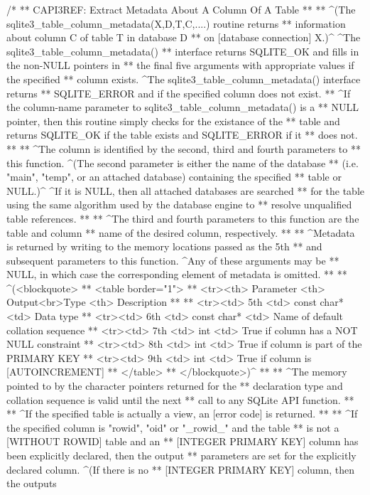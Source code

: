 \begin{Codex}[label=sqlite3.h,numbers=left]
{/*
** CAPI3REF: Extract Metadata About A Column Of A Table
**
** ^(The sqlite3_table_column_metadata(X,D,T,C,....) routine returns
** information about column C of table T in database D
** on [database connection] X.)^  ^The sqlite3_table_column_metadata()
** interface returns SQLITE_OK and fills in the non-NULL pointers in
** the final five arguments with appropriate values if the specified
** column exists.  ^The sqlite3_table_column_metadata() interface returns
** SQLITE_ERROR and if the specified column does not exist.
** ^If the column-name parameter to sqlite3_table_column_metadata() is a
** NULL pointer, then this routine simply checks for the existance of the
** table and returns SQLITE_OK if the table exists and SQLITE_ERROR if it
** does not.
**
** ^The column is identified by the second, third and fourth parameters to
** this function. ^(The second parameter is either the name of the database
** (i.e. "main", "temp", or an attached database) containing the specified
** table or NULL.)^ ^If it is NULL, then all attached databases are searched
** for the table using the same algorithm used by the database engine to
** resolve unqualified table references.
**
** ^The third and fourth parameters to this function are the table and column
** name of the desired column, respectively.
**
** ^Metadata is returned by writing to the memory locations passed as the 5th
** and subsequent parameters to this function. ^Any of these arguments may be
** NULL, in which case the corresponding element of metadata is omitted.
**
** ^(<blockquote>
** <table border="1">
** <tr><th> Parameter <th> Output<br>Type <th>  Description
**
** <tr><td> 5th <td> const char* <td> Data type
** <tr><td> 6th <td> const char* <td> Name of default collation sequence
** <tr><td> 7th <td> int         <td> True if column has a NOT NULL constraint
** <tr><td> 8th <td> int         <td> True if column is part of the PRIMARY KEY
** <tr><td> 9th <td> int         <td> True if column is [AUTOINCREMENT]
** </table>
** </blockquote>)^
**
** ^The memory pointed to by the character pointers returned for the
** declaration type and collation sequence is valid until the next
** call to any SQLite API function.
**
** ^If the specified table is actually a view, an [error code] is returned.
**
** ^If the specified column is "rowid", "oid" or "_rowid_" and the table 
** is not a [WITHOUT ROWID] table and an
** [INTEGER PRIMARY KEY] column has been explicitly declared, then the output
** parameters are set for the explicitly declared column. ^(If there is no
** [INTEGER PRIMARY KEY] column, then the outputs
}
\end{Codex}
